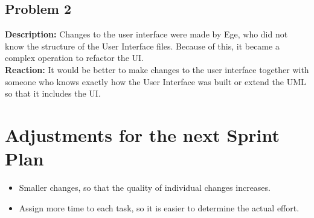 \documentclass[10pt]{article}
\begin{document}
\subsection*{Problem 2}
\textbf{Description:}
Changes to the user interface were made by Ege, who did not know the structure of the User Interface files. Because of this, it became a complex operation to refactor the UI.\\
\textbf{Reaction:} 
It would be better to make changes to the user interface together with someone who knows exactly how the User Interface was built or extend the UML so that it includes the UI.

\section*{Adjustments for the next Sprint Plan}
\begin{itemize}
\item Smaller changes, so that the quality of individual changes increases.
\item Assign more time to each task, so it is easier to determine the actual effort.
\end{itemize}
\end{document}
